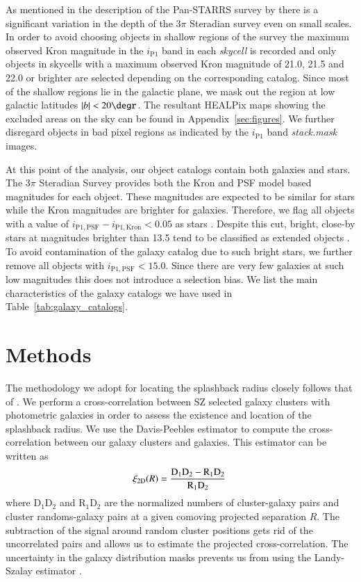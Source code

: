 \documentclass[iop, apjl, twocolappendix, numberedappendix]{emulateapj}
\begin{document}
As mentioned in the description of the Pan-STARRS survey by
\citet{chambers2016pan} there is a significant variation in the
depth of the 3$\pi$ Steradian survey even on small scales. In order
to avoid choosing objects in shallow regions of the survey the
maximum observed Kron magnitude in the $i_{\mathrm{P1}}$ band in
each \textit{skycell} is recorded and only objects in skycells with
a maximum observed Kron magnitude of 21.0, 21.5 and 22.0 or brighter
are selected depending on the corresponding catalog. Since most of
the shallow regions lie in the galactic plane, we mask out the
region at low galactic latitudes $|b|<20\degr$. The resultant
HEALPix maps showing the excluded areas on the sky can be found in
Appendix~\ref{sec:figures}. We further disregard objects in bad
pixel regions as indicated by the $i_{\mathrm{P1}}$ band
\textit{stack.mask} images.

At this point of the analysis, our object catalogs contain both
galaxies and stars. The 3$\pi$ Steradian Survey provides both the
Kron and PSF model based magnitudes for each object. These
magnitudes are expected to be similar for stars while the Kron
magnitudes are brighter for galaxies. Therefore, we flag all objects
with a value of $i_{\mathrm{P1,PSF}} - i_{\mathrm{P1,Kron}}< 0.05$
as stars \citep{farrow2013pan}. Despite this cut, bright, close-by
stars at magnitudes brighter than 13.5 tend to be classified as
extended objects \citep{chambers2016pan}. To avoid contamination of
the galaxy catalog due to such bright stars, we further remove all
objects with $i_{\mathrm{P1,PSF}} < 15.0$. Since there are very few
galaxies at such low magnitudes this does not introduce a selection
bias. We list the main characteristics of the galaxy catalogs we
have used in Table~\ref{tab:galaxy_catalogs}.

\section{Methods}
\label{sec:estimators}
The methodology we adopt for locating the splashback radius closely
follows that of \citet{more2016detection}. We perform a
cross-correlation between SZ selected galaxy clusters with photometric
galaxies in order to assess the existence and location of the
splashback radius. We use the Davis-Peebles estimator
\citep{davis1983survey} to compute the cross-correlation between our
galaxy clusters and galaxies. This estimator can be written as
\begin{equation}
\xi_{\rm 2D}(R) = \frac{\rm D_1D_2-R_1D_2}{\rm R_1D_2}\,
\end{equation}
where D$_1$D$_2$ and R$_1$D$_2$ are the normalized numbers of
cluster-galaxy pairs and cluster randoms-galaxy pairs at a given
comoving projected separation $R$. The subtraction of the signal
around random cluster positions gets rid of the uncorrelated pairs and allows
us to estimate the projected cross-correlation. The uncertainty in the galaxy
distribution masks prevents us from using the Landy-Szalay estimator \citep{landy1993bias}. 
\end{document}
